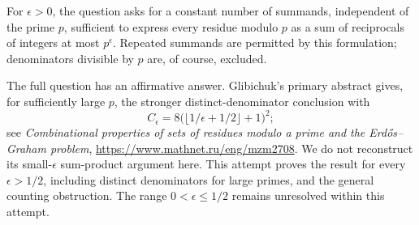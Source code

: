 For $\epsilon>0$, the question asks for a constant number of summands, independent of the prime $p$, sufficient to express every residue modulo $p$ as a sum of reciprocals of integers at most $p^\epsilon$. Repeated summands are permitted by this formulation; denominators divisible by $p$ are, of course, excluded.

The full question has an affirmative answer. Glibichuk's primary abstract gives, for sufficiently large $p$, the stronger distinct-denominator conclusion with
\[
 C_\epsilon=8\bigl(\lfloor1/\epsilon+1/2\rfloor+1\bigr)^2;
\]
see \emph{Combinational properties of sets of residues modulo a prime and the Erd\H{o}s--Graham problem}, \url{https://www.mathnet.ru/eng/mzm2708}. We do not reconstruct its small-$\epsilon$ sum-product argument here. This attempt proves the result for every $\epsilon>1/2$, including distinct denominators for large primes, and the general counting obstruction. The range $0<\epsilon\le1/2$ remains unresolved within this attempt.
